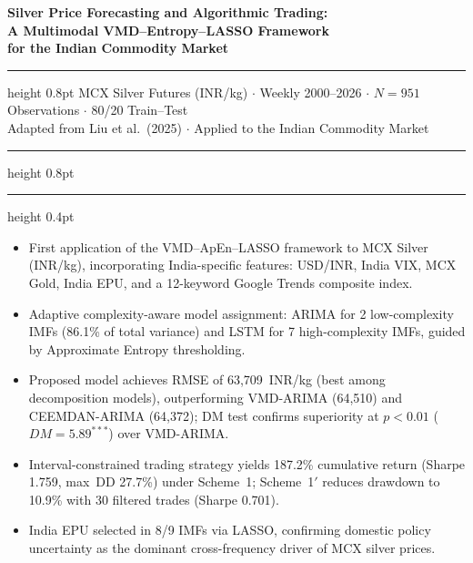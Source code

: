 \documentclass[12pt,a4paper]{article}
\begin{document}
\setlength{\parindent}{0pt}\setlength{\parskip}{6pt}

\thispagestyle{empty}
\begin{center}
{\LARGE\bfseries\color{ElsBlue}
  Silver Price Forecasting and Algorithmic Trading:\\[4pt]
  A Multimodal VMD--Entropy--LASSO Framework\\[4pt]
  for the Indian Commodity Market}\\[18pt]
\hrule height 0.8pt\vspace{6pt}
{\small MCX Silver Futures (INR/kg) $\cdot$ Weekly 2000--2026
 $\cdot$ $N=951$ Observations $\cdot$ 80/20 Train--Test\\[3pt]
 Adapted from Liu et al.\ (2025) $\cdot$ Applied to the Indian Commodity Market}
\vspace{6pt}\hrule height 0.8pt
\end{center}
\vspace{8pt}

\vspace{3pt}\hrule height 0.4pt\vspace{5pt}
\begin{itemize}[leftmargin=1.5em,itemsep=2pt]
  \item First application of the VMD--ApEn--LASSO framework to MCX Silver (INR/kg),
        incorporating India-specific features: USD/INR, India VIX, MCX Gold, India EPU,
        and a 12-keyword Google Trends composite index.
  \item Adaptive complexity-aware model assignment: ARIMA for 2 low-complexity IMFs
        (86.1\% of total variance) and LSTM for 7 high-complexity IMFs, guided by
        Approximate Entropy thresholding.
  \item Proposed model achieves RMSE of 63,709~INR/kg (best among decomposition
        models), outperforming VMD-ARIMA (64,510) and CEEMDAN-ARIMA (64,372);
        DM test confirms superiority at $p<0.01$ ($DM=5.89^{***}$) over VMD-ARIMA.
  \item Interval-constrained trading strategy yields 187.2\% cumulative return
        (Sharpe 1.759, max~DD 27.7\%) under Scheme~1; Scheme~1$'$ reduces
        drawdown to 10.9\% with 30 filtered trades (Sharpe 0.701).
  \item India EPU selected in 8/9 IMFs via LASSO, confirming domestic policy
        uncertainty as the dominant cross-frequency driver of MCX silver prices.
\end{itemize}
\end{document}
